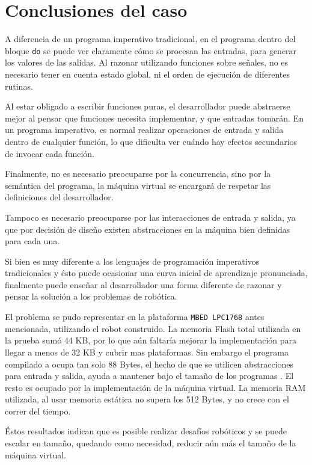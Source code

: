 




\section {Conclusiones del caso}

  A diferencia de un programa imperativo tradicional, en el programa
\frob{} dentro del bloque \texttt{do} se puede ver claramente cómo
se procesan las entradas, para generar los valores de las salidas.
  Al razonar utilizando funciones sobre señales, no es necesario
tener en cuenta estado global, ni el orden de ejecución de
diferentes rutinas.

  Al estar obligado a escribir funciones puras, el desarrollador
puede abstraerse mejor al pensar que funciones necesita implementar,
y que entradas tomarán. En un programa imperativo, es normal realizar
operaciones de entrada y salida dentro de cualquier función, lo que
dificulta ver cuándo hay efectos secundarios de invocar cada función.

  Finalmente, no es necesario preocuparse por la concurrencia, sino
por la semántica del programa, la máquina virtual se encargará de
respetar las definiciones del desarrollador.

  Tampoco es necesario preocuparse por las interacciones de entrada
y salida, ya que por decisión de diseño existen abstracciones en
la máquina bien definidas para cada una.

  Si bien \frob{} es muy diferente a los lenguajes de
programación imperativos tradicionales y ésto puede ocasionar una
curva inicial de aprendizaje pronunciada, finalmente puede enseñar al
desarrollador una forma diferente de razonar y pensar la solución
a los problemas de robótica.

  El problema se pudo representar en la plataforma \texttt{MBED LPC1768} antes
mencionada, utilizando el robot construido.
  La memoria Flash total utilizada en la prueba sumó 44 KB, por lo que
aún faltaría mejorar la implementación para llegar a menos de 32 KB y
cubrir mas plataformas.
  Sin embargo el programa \frob{} compilado a \alf{} ocupa tan solo 88 Bytes,
el hecho de que se utilicen abstracciones para entrada y salida, ayuda a mantener
bajo el tamaño de los programas \alf{}. El resto es ocupado por la implementación de
la máquina virtual.
  La memoria RAM utilizada, al usar memoria estática no supera los 512 Bytes, y no
crece con el correr del tiempo.

  Éstos resultados indican que es posible realizar desafíos robóticos y se puede
escalar en tamaño, quedando como necesidad, reducir aún más el tamaño de la
máquina virtual.
